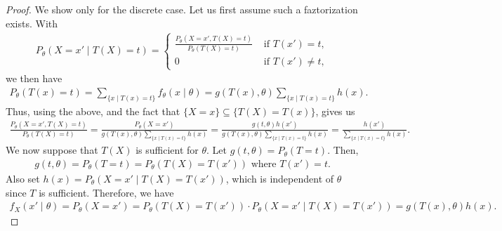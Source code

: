 \begin{proof}
    We show only for the discrete case. Let us first assume such a faztorization exists. With
    \begin{align}
        P_{\theta}(X=x' \mid T(X) = t) = \begin{cases}
            \frac{P_{\theta}(X=x',T(X)=t)}{P_{\theta}(T(X)=t)} &\text{ if } T(x') = t,\\
            0 &\text{ if } T(x') \neq t,
        \end{cases}
    \end{align}
    we then have
    \begin{align}
        P_{\theta}(T(x) = t) = \sum_{\{x \mid T(x) = t\}} f_{\theta}(x \mid \theta) = g(T(x),\theta) \sum_{\{x \mid T(x) = t\}} h(x).
    \end{align}
    Thus, using the above, and the fact that $\{X = x\} \subseteq \{T(X) = T(x)\}$, gives us
    \begin{align}
        \frac{P_{\theta}(X=x',T(X)=t)}{P_{\theta}(T(X)=t)} = \frac{P_{\theta}(X=x')}{g(T(x),\theta) \sum_{\{x \mid T(x) = t\}} h(x)} = \frac{g(t,\theta)h(x')}{g(T(x),\theta) \sum_{\{x \mid T(x) = t\}} h(x)} =  \frac{h(x')}{\sum_{\{x \mid T(x) = t\}} h(x)}.
    \end{align}
    We now suppose that $T(X)$ is sufficient for $\theta$. Let $g(t,\theta) = P_{\theta}(T=t)$. Then,
    \begin{align}
        g(t,\theta) = P_{\theta}(T=t) = P_{\theta}(T(X)=T(x')) \text{ where } T(x') = t.
    \end{align}
    Also set $h(x) = P_{\theta}(X = x' \mid T(X) = T(x'))$, which is independent of $\theta$ since $T$ is sufficient. Therefore, we have
    \begin{align}
        f_{X}(x'\mid \theta) = P_{\theta}(X=x') = P_{\theta}(T(X)=T(x')) \cdot P_{\theta}(X=x' \mid T(X) = T(x')) = g(T(x),\theta) h(x).
    \end{align}
\end{proof}


